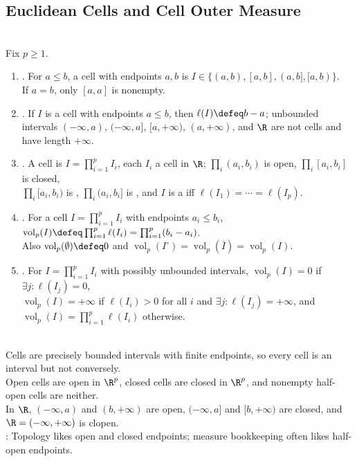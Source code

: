 \subsection{Euclidean Cells and Cell Outer Measure}

\begin{definition} \label{def:measure-cells-intervals-volume-rp} \\
Fix $p\geq1$.
\begin{enumerate}[label=(\roman*)]
\setlength{\itemsep}{0pt}
\item {}. For $a\leq b$, a cell with endpoints $a,b$ is $I\in\{(a,b),[a,b],(a,b],[a,b)\}$.\\
If $a=b$, only $[a,a]$ is nonempty.
\item {}. If $I$ is a cell with endpoints $a\leq b$, then $\ell(I)\defeq b-a$; unbounded intervals $(-\infty,a)$, $(-\infty,a]$, $[a,+\infty)$, $(a,+\infty)$, and $\R$ are not cells and have length $+\infty$.
\item {}. A cell is $I=\prod_{i=1}^{p}I_i$, each $I_i$ a cell in $\R$; $\prod_i(a_i,b_i)$ is open, $\prod_i[a_i,b_i]$ is closed,\\
$\prod_i[a_i,b_i)$ is , $\prod_i(a_i,b_i]$ is , and $I$ is a  iff $\ell(I_1)=\cdots=\ell(I_p)$.
\item {}. For a cell $I=\prod_{i=1}^{p}I_i$ with endpoints $a_i\leq b_i$, $\operatorname{vol}_p(I)\defeq\prod_{i=1}^{p}\ell(I_i)=\prod_{i=1}^{p}(b_i-a_i)$.\\
Also $\operatorname{vol}_p(\emptyset)\defeq0$ and $\operatorname{vol}_p(I^\circ)=\operatorname{vol}_p(\overline I)=\operatorname{vol}_p(I)$.
\item {}. For $I=\prod_{i=1}^{p}I_i$ with possibly unbounded intervals, $\operatorname{vol}_p(I)=0$ if $\exists j:\ell(I_j)=0$,\\
$\operatorname{vol}_p(I)=+\infty$ if $\ell(I_i)>0$ for all $i$ and $\exists j:\ell(I_j)=+\infty$, and $\operatorname{vol}_p(I)=\prod_{i=1}^{p}\ell(I_i)$ otherwise.
\end{enumerate}
\end{definition}

\begin{remark} \label{rem:cell-interval-topological-conventions} \\
Cells are precisely bounded intervals with finite endpoints, so every cell is an interval but not conversely.\\
Open cells are open in $\R^p$, closed cells are closed in $\R^p$, and nonempty half-open cells are neither.\\
In $\R$, $(-\infty,a)$ and $(b,+\infty)$ are open, $(-\infty,a]$ and $[b,+\infty)$ are closed, and $\R=(-\infty,+\infty)$ is clopen.\\
: Topology likes open and closed endpoints; measure bookkeeping often likes half-open endpoints.
\end{remark}

